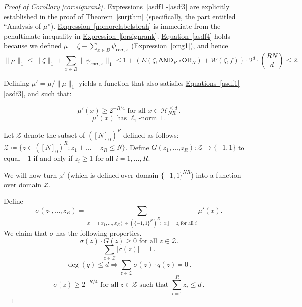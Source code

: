 \documentclass[11pt]{article}
\numberwithin{equation}{section}
\theoremstyle{definition}
\theoremstyle{plain}
\newcommand{\expref}[2]{\hyperref[#2]{#1~\ref{#2}}}
\newcommand{\expeqref}[2]{\hyperref[#2]{#1~\eqref{#2}}}
\newcommand{\OR}{\mathsf{ OR}}
\newcommand{\bits}{\{-1,1\}}
\newcommand{\AND}{\mathsf{AND}}
\begin{document}
\begin{proof}[Proof of Corollary \ref{cor:signrank}]
\expeqref{Expressions}{asdf1}-\eqref{asdf3} are explicitly established in the proof of \expref{Theorem}{surjthm} (specifically, the part entitled ``Analysis of $\mu$'').  %
\expeqref{Expression}{nomorelabelsbrah} is immediate from the penultimate inequality in 
\expeqref{Expression}{forsignrank}.
\expeqref{Equation}{asdf4} holds because we defined $\mu= \zeta - \sum_{x \in B} \psi_{\mathsf{corr}, x}$ (\expeqref{Expression}{omg1}),
and hence $$\|\mu\|_1 \leq \|\zeta\|_1 + \sum_{x \in B} \|\psi_{\mathsf{corr}, x}\|_1 \leq
1 + \left(E\left(\zeta, \AND_R \circ \OR_N\right) +W\left(\zeta, f\right)\right) \cdot 2^d \cdot {RN \choose d}
\leq 2.$$ 


Defining $\mu'=\mu/\|\mu\|_1$ yields a function that also satisfies
\expeqref{Equations}{asdf1}-\eqref{asdf3}, and such that:

\begin{equation} \label{nomorelabelsbrahsweet}
\mu'(x) \geq 2^{-R/4} \text{ for all } x \in \mathcal{H}_{NR}^{\leq d}\,.
\end{equation}
\begin{equation} \label{asdf42}
\mu'(x) \text{ has } \ell_1\text{-norm } 1\,.
\end{equation}



Let $\mathcal{Z}$ denote the subset of $\left([N]_0\right)^R$ defined as follows: $\mathcal{Z} \coloneqq  \{z \in \left([N]_0\right)^R \colon z_1 + \dots +z_R \leq N\}$. 
Define $G(z_1, \dots, z_R) \colon \mathcal{Z} \to \bits$ to equal $-1$
if and only if $z_i \geq 1$ for all $i=1, \dots, R.$ 


We will now turn $\mu'$ (which is defined over domain $\bits^{NR}$) into a function over domain $\mathcal{Z}$. 


Define $$\sigma(z_1, \dots, z_R) = \sum_{x=(x_1, \dots, x_R) \in \left(\bits^{N}\right)^R: |x_i|=z_i \text{ for all } i} \mu'(x).$$
We claim that $\sigma$ has
the following properties.
\begin{equation} \label{mysouliscrushed1}
\sigma(z) \cdot G(z) \geq 0 \text{ for all } z \in \mathcal{Z}.
\end{equation}
\begin{equation}
\sum_{z \in \mathcal{Z}} |\sigma(z)|=1\,. \label{brr2}
\end{equation}
\begin{equation} \label{phdsigmasigh}
\deg(q) \leq d \Longrightarrow \sum_{z \in \mathcal{Z}} \sigma(z) \cdot q(z) =0\,.
\end{equation}
\begin{equation} \label{zrp2}
\sigma(z) \geq 2^{-R/4} \text{ for all } z \in \mathcal{Z} \text{ such that } \sum_{i=1}^{R} z_i \leq d\,.
\end{equation}


\end{proof}
\end{document}
